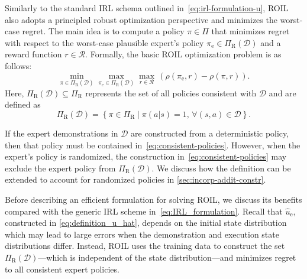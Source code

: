 \documentclass[10pt]{article}
\theoremstyle{plain}
\theoremstyle{remark}
\begin{document}
Similarly to the standard IRL schema outlined in~\eqref{eq:irl-formulation-u}, ROIL also adopts a principled robust optimization perspective and minimizes the worst-case regret.  The main idea is to compute a policy $\pi\in \Pi$ that minimizes regret with respect to the worst-case plausible expert's policy $\pi_{\mathrm{e}} \in \Pi_{\mathrm{R}}(\mathcal{D})$ and a reward function $r\in \mathcal{R}$. Formally, the basic ROIL optimization problem is as follows:
\begin{equation}
\label{eq:robust_IRL_formulation}
\min_{\pi \in \Pi_{\mathrm{R}}(\mathcal{D})}  \max_{\pi_{\mathrm{e}} \in \Pi_{\mathrm{R}}(\mathcal{D})} \max_{r \in \mathcal{R}} \,
\left(\rho(\pi_{\mathrm{e}}, r) - \rho(\pi, r)\right).
\end{equation}
Here, $ \Pi_{\mathrm{R}}(\mathcal{D}) \subseteq \Pi_{\mathrm{R}}$ represents the set of all policies consistent with $\mathcal{D}$ and are defined as 
%
\begin{equation} \label{eq:consistent-policies}
\Pi_{\mathrm{R}}(\mathcal{D}) = \left\{ \pi \in \Pi_{\mathrm{R}} \mid \pi(a|s) = 1, \, \forall (s,a) \in \mathcal{D} \right\}.
\end{equation}

If the expert demonstrations in $\mathcal{D}$ are constructed from a deterministic policy, then that policy must be contained in~\eqref{eq:consistent-policies}. However, when the expert's policy is randomized, the construction in~\eqref{eq:consistent-policies} may exclude the expert policy from $\Pi_{\mathrm{R}}(\mathcal{D})$. We discuss how the definition can be extended to account for randomized policies in \cref{sec:incorp-addit-constr}. 

Before describing an efficient formulation for solving ROIL, we discuss its benefits compared with the generic IRL scheme in~\eqref{eq:IRL_formulation}. Recall that $\hat{u}_{\mathrm{e}}$, constructed in \eqref{eq:definition_u_hat},  depends on the initial state distribution which may lead to large errors when the demonstration and execution state distributions differ. Instead, ROIL uses the training data to construct the set $\Pi_{\mathrm{R}}(\mathcal{D})$---which is independent of the state distribution---and minimizes regret to all consistent expert policies. 
\end{document}
